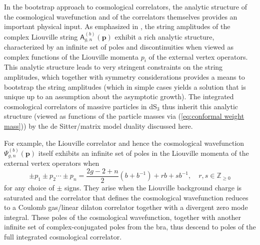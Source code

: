 \documentclass[12pt,a4paper]{article}
\renewcommand{\geq}{\geqslant}
\begin{document}
In the bootstrap approach to cosmological correlators, the analytic structure of the cosmological wavefunction and of the correlators themselves provides an important physical input. As emphasized in \cite{paper1}, the string amplitudes of the complex Liouville string $\mathsf{A}_{g,n}^{(b)}(\boldsymbol{p})$ exhibit a rich analytic structure, characterized by an infinite set of poles and discontinuities when viewed as complex functions of the Liouville momenta $p_i$ of the external vertex operators. This analytic structure leads to very stringent constraints on the string amplitudes, which together with symmetry considerations provides a means to bootstrap the string amplitudes (which in simple cases yields a solution that is unique up to an assumption about the asymptotic growth). The integrated cosmological correlators of massive particles in dS$_3$ thus inherit this analytic structure (viewed as functions of the particle masses via (\ref{eq:conformal weight mass})) by the de Sitter/matrix model duality discussed here.

For example, the Liouville correlator and hence the cosmological wavefunction $\Psi^{(b)}_{g,n}(\boldsymbol{p})$ itself exhibits an infinite set of poles in the Liouville momenta of the external vertex operators when
\begin{equation}\label{eq:Liouville correlator poles}
    \pm p_1 \pm p_2 \cdots \pm p_n = \frac{2g-2+n}{2}(b+b^{-1}) + rb+sb^{-1},\quad r,s\in\mathbb{Z}_{\geq 0}
\end{equation}
for any choice of $\pm$ signs.
They arise when the Liouville background charge is saturated and the correlator that defines the cosmological wavefunction reduces to a Coulomb gas/linear dilaton correlator together with a divergent zero mode integral.
These poles of the cosmological wavefunction, together with another infinite set of complex-conjugated poles from the bra, thus descend to poles of the full integrated cosmological correlator. 
\end{document}
